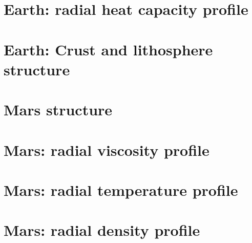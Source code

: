 \section{Earth: radial heat capacity profile}  %


\newpage %
\section{Earth: Crust and lithosphere structure}  %



\newpage %
\section{Mars structure} 
\newpage %
\section{Mars: radial viscosity profile} 
\newpage %
\section{Mars: radial temperature profile} 
\newpage %
\section{Mars: radial density profile} 


